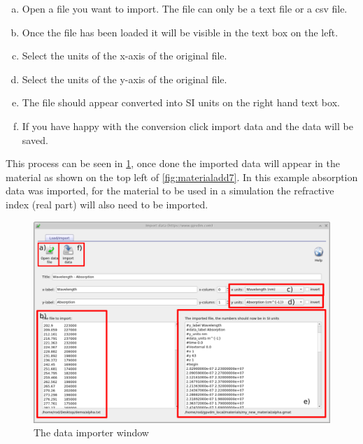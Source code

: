 \begin{enumerate}[a)]
\vspace{-0.2cm}\item Open a file you want to import. The file can only be a text file or a csv file.
\vspace{-0.2cm}\item Once the file has been loaded it will be visible in the text box on the left.
\vspace{-0.2cm}\item Select the units of the x-axis of the original file.
\vspace{-0.2cm}\item Select the units of the y-axis of the original file.
\vspace{-0.2cm}\item The file should appear converted into SI units on the right hand text box.
\vspace{-0.2cm}\item If you have happy with the conversion click import data and the data will be saved.
\end{enumerate}
This process can be seen in \ref{fig:materialadd6}, once done the imported data will appear in the material as shown on the top left of \ref{fig:materialadd7}. In this example absorption data was imported, for the material to be used in a simulation the refractive index (real part) will also need to be imported.

\begin{figure}
\centering
\includegraphics[height=0.7\textwidth]{./images/database_materials/database_import_window.png}
\caption{The data importer window}
\label{fig:materialadd6}
\end{figure}

